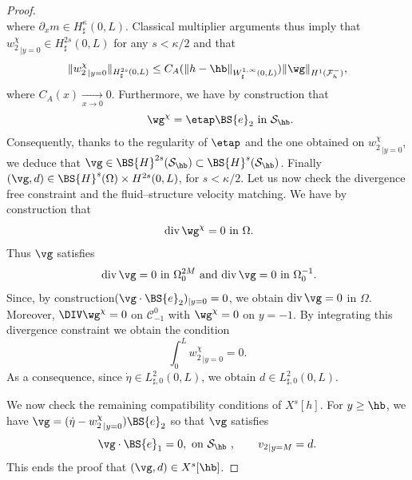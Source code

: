 \begin{proof}
\[\]
where $\partial_x m\in H^\kappa_\sharp(0, L)$. Classical multiplier arguments thus imply that ${w_{2}^\chi}_{|{y=0}} \in H^{2s}_{\sharp}(0,L)$ for any $s < \kappa/2$ and that
\begin{equation} \label{eq.lapremieresurw2chi}
\|{w_{2}^\chi}_{|{y=0}}\|_{H^{2s}_{\sharp}(0,L)} \leq C_A(\|h-\hb\|_{W^{1,\infty}_{\sharp}(0,L)}) \|\wg\|_{H^1(\mathcal F^{-}_h)},
\end{equation}
where $C_{A}(x)\underset{x\to 0}{\to}0$.
Furthermore, we have by construction that
\[
\text{
\qquad $\wg^\chi= \etap \BS{e}_{2}$ in $\mathcal {S}_\hb$.}
\]
Consequently, thanks to the regularity of $\etap$ and the one obtained on ${{w}^\chi_{2}}_{|{y=0}}$, we deduce that $\vg\in \BS{H}^{2s}(\mathcal {S}_\hb)\subset \BS{H}^{s}(\mathcal {S}_\hb)$.
Finally $(\vg, d)\in \BS{H}^s(\Omega)\times H^{2s}(0, L)$, for $s<\kappa/2$.
Let us now check the divergence free constraint and the fluid--structure velocity matching.
We have by construction that
\[
\text{
$\text{div}\,\wg^\chi =0$ in $\Omega$.}
\]
Thus $\vg$ satisfies
\[
\text{
$\text{div}\,\vg =0$ in $\Omega^{2M}_{0}$ and $\text{div}\,\vg =0$ in $\Omega^{-1}_{0}$.}
\]
Since, by construction$(\vg\cdot\BS{e}_{2})_{|{y=0}}=0$, we obtain $\text{div}\,\vg =0$ in $\Omega$.
Moreover, $\DIV \wg^{\chi} = 0$ on $\mathcal C_{-1}^0$ with $\wg^{\chi} = 0$ on $y=-1$.
By integrating this divergence constraint we obtain the condition
\[
\int_{0}^L {w_{2}^\chi}_{|{y=0}} = 0.
\]
As a consequence, since $\dot\eta\in L^2_{\sharp,0}(0,L)$, we obtain $d \in L^2_{\sharp,0}(0,L)$.

We now check the remaining compatibility conditions of $X^s[h]$. For $y \geq \hb$, we have $\vg = ( \dot{\eta} - {w_{2}^\chi}_{|{y=0}}) \BS{e}_2$ so that $\vg$ satisfies
\[
\vg \cdot \BS{e}_1 = 0, \text{ on $\mathcal S_{\hb}$ }, \qquad {v_2}_{|{y=M}} = d.
\]
This ends the proof that $(\vg,d) \in X^s[\hb]$.


\end{proof}
